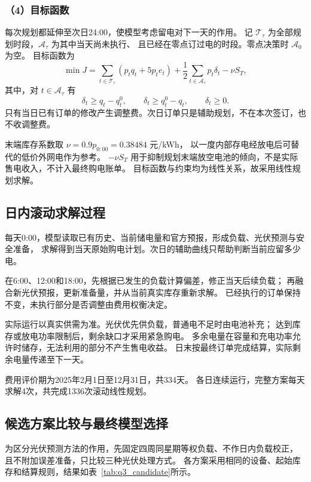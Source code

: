 \subsubsection*{（4）目标函数}

每次规划都延伸至次日24:00，使模型考虑留电对下一天的作用。
记 $\mathcal T_{\tau}$ 为全部规划时段，$\mathcal A_{\tau}$ 为其中当天尚未执行、
且已经在零点订过电的时段。零点决策时 $\mathcal A_0$ 为空。
目标函数为
\begin{equation}
\min J=\sum_{t\in\mathcal T_{\tau}}(p_tq_t+5p_te_t)
+\frac12\sum_{t\in\mathcal A_{\tau}}p_t\delta_t-\nu S_T,
\end{equation}
其中，对 $t\in\mathcal A_{\tau}$ 有
\begin{equation}
\delta_t\geq q_t-q_t^0,\qquad
\delta_t\geq q_t^0-q_t,\qquad\delta_t\geq0.
\end{equation}
只有当日已有订单的修改产生调整费。次日订单只是辅助规划，不在本次签订，也不收调整费。

末端库存系数取 $\nu=0.9p_{0:00}=0.38484$ 元/kWh，
以一度内部存电经放电后可替代的低价外网电作为参考。
$-\nu S_T$ 用于抑制规划末端放空电池的倾向，不是实际售电收入，不计入最终购电账单。
目标函数与约束均为线性关系，故采用线性规划求解。

\subsection{日内滚动求解过程}

每天0:00，模型读取已有历史、当前储电量和官方预报，形成负载、光伏预测与安全准备，
求解得到当天原始购电计划。次日的辅助曲线只帮助判断当前应留多少电。

在6:00、12:00和18:00，先根据已发生的负载计算偏差，修正当天后续负载；
再融合新光伏预报，更新准备量，并从当前真实库存重新求解。
已经执行的订单保持不变，未执行部分是否调整由费用权衡决定。

实际运行以真实供需为准。光伏优先供负载，普通电不足时由电池补充；
达到库存或放电功率限制后，剩余缺口才采用紧急购电。
多余电量在容量和充电功率允许时储存，无法利用的部分不产生售电收益。
日末按最终订单完成结算，实际剩余电量传递至下一天。

费用评价期为2025年2月1日至12月31日，共334天。
各日连续运行，完整方案每天求解4次，共完成1336次滚动线性规划。

\subsection{候选方案比较与最终模型选择}

为区分光伏预测方法的作用，先固定四周同星期等权负载、不作日内负载校正，
且不附加误差准备，只比较三种光伏处理方式。
各方案采用相同的设备、起始库存和结算规则，结果如表~\ref{tab:q3_candidate}所示。

